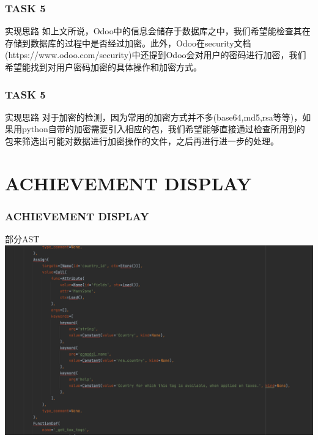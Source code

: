 \documentclass[10pt]{ctexbeamer}
\begin{document}
    \begin{frame}
        \frametitle{TASK 5}
        \begin{block}{实现思路}
            如上文所说，Odoo中的信息会储存于数据库之中，我们希望能检查其在存储到数据库的过程中是否经过加密。此外，Odoo在security文档(https://www.odoo.com/security)中还提到Odoo会对用户的密码进行加密，我们希望能找到对用户密码加密的具体操作和加密方式。
        \end{block}
    \end{frame}

    \begin{frame}
        \frametitle{TASK 5}
        \begin{block}{实现思路}
            对于加密的检测，因为常用的加密方式并不多(base64,md5,rsa等等)，如果用python自带的加密需要引入相应的包，我们希望能够直接通过检查所用到的包来筛选出可能对数据进行加密操作的文件，之后再进行进一步的处理。
        \end{block}
    \end{frame}

    \section{ACHIEVEMENT DISPLAY}
    \begin{frame}
        \frametitle{ACHIEVEMENT DISPLAY}
    
        \begin{block}{部分AST}
            \includegraphics[scale=0.268]{AST.png}
        \end{block}
    \end{frame}
\end{document}
